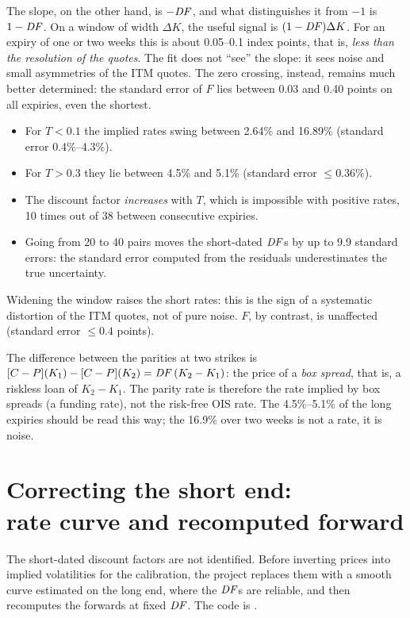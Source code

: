 The slope, on the other hand, is $-\mathit{DF}$, and what distinguishes it from $-1$ is $1-\mathit{DF}$. On a window of width
$\Delta K$, the useful signal is $(1-\mathit{DF})\Delta K$. For an expiry of one or two weeks this is about 0.05--0.1 index
points, that is, \emph{less than the resolution of the quotes}. The fit does not ``see'' the slope: it sees noise and
small asymmetries of the ITM quotes. The zero crossing, instead, remains much better determined: the standard error
of $F$ lies between 0.03 and 0.40 points on all expiries, even the shortest.

\begin{progetto}[title={In the qpricer project: the raw implied rates}]
\begin{itemize}
\item For $T<0.1$ the implied rates swing between 2.64\% and 16.89\% (standard error 0.4\%--4.3\%).
\item For $T>0.3$ they lie between 4.5\% and 5.1\% (standard error $\le0.36\%$).
\item The discount factor \emph{increases} with $T$, which is impossible with positive rates, 10 times out of 38
between consecutive expiries.
\item Going from 20 to 40 pairs moves the short-dated $\mathit{DF}$s by up to 9.9 standard errors: the standard error
computed from the residuals underestimates the true uncertainty.
\end{itemize}
Widening the window raises the short rates: this is the sign of a systematic distortion of the ITM quotes, not of
pure noise. $F$, by contrast, is unaffected (standard error $\le0.4$ points).
\end{progetto}

\begin{idea}[title={What rate is the parity rate?}]
The difference between the parities at two strikes is $[C-P](K_1)-[C-P](K_2)=\mathit{DF}\,(K_2-K_1)$: the price of a
\emph{box spread}, that is, a riskless loan of $K_2-K_1$. The parity rate is therefore the rate implied by box spreads
(a funding rate), not the risk-free OIS rate. The 4.5\%--5.1\% of the long expiries should be read this way; the
16.9\% over two weeks is not a rate, it is noise.
\end{idea}

\section[Correcting the short end: rate curve and recomputed forward]{Correcting the short end:\\
rate curve and recomputed forward}
\label{sec:breve-termine}
The short-dated discount factors are not identified. Before inverting prices into implied volatilities for the
calibration, the project replaces them with a smooth curve estimated on the long end, where the $\mathit{DF}$s are reliable,
and then recomputes the forwards at fixed $\mathit{DF}$. The code is .

